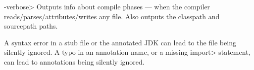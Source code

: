 \begin{description}
\item \<-verbose>
  Outputs info about compile phases --- when the compiler
  reads/parses/attributes/writes any file.  Also outputs the classpath and
  sourcepath paths.
\end{description}

A syntax error in a stub file or the annotated JDK can lead to the file
being silently ignored.  A typo in an annotation name, or a missing
\<import> statement, can lead to annotations being silently ignored.


